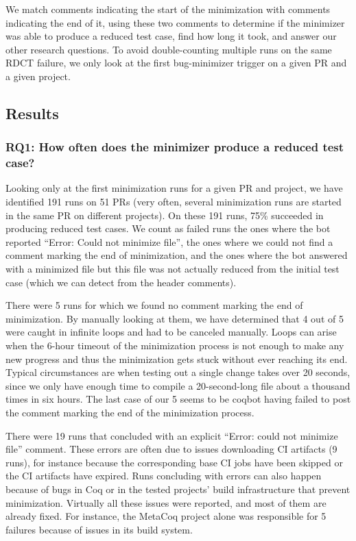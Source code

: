 \documentclass[a4paper,USenglish,cleveref,autoref,thm-restate,pdfa]{lipics-v2021}
\begin{document}
We match comments indicating the start of the minimization with comments indicating the end of it, using these two comments to determine if the minimizer was able to produce a reduced test case, find how long it took, and answer our other research questions.
To avoid double-counting multiple runs on the same RDCT failure, we only look at the first bug-minimizer trigger on a given PR and a given project.

\subsection{Results}

\subsubsection{RQ1: How often does the minimizer produce a reduced test case?}

Looking only at the first minimization runs for a given PR and project, we have identified 191 runs on 51 PRs (very often, several minimization runs are started in the same PR on different projects).
On these 191 runs, 75\% succeeded in producing reduced test cases. We count as failed runs the ones where the bot reported ``Error: Could not minimize file'', the ones where we could not find a comment marking the end of minimization, and the ones where the bot answered with a minimized file but this file was not actually reduced from the initial test case (which we can detect from the header comments).

There were 5 runs for which we found no comment marking the end of minimization. By manually looking at them, we have determined that 4 out of 5 were caught in infinite loops and had to be canceled manually. Loops can arise when the 6-hour timeout of the minimization process is not enough to make any new progress and thus the minimization gets stuck without ever reaching its end. Typical circumstances are when testing out a single change takes over 20 seconds, since we only have enough time to compile a 20-second-long file about a thousand times in six hours. The last case of our 5 seems to be coqbot having failed to post the comment marking the end of the minimization process.

There were 19 runs that concluded with an explicit ``Error: could not minimize file'' comment. These errors are often due to issues downloading CI artifacts (9 runs), for instance because the corresponding base CI jobs have been skipped or the CI artifacts have expired. Runs concluding with errors can also happen because of bugs in Coq or in the tested projects' build infrastructure that prevent minimization. Virtually all these issues were reported, and most of them are already fixed. For instance, the MetaCoq project alone was responsible for 5 failures because of issues in its build system.
\end{document}
